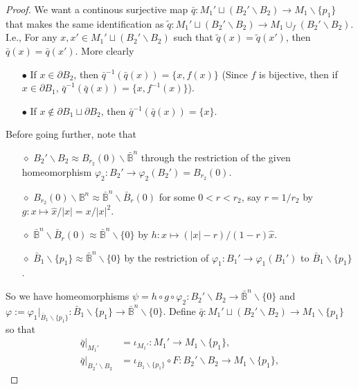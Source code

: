 \documentclass[a4paper]{article}
\theoremstyle{remark}
\newcommand{\openball}{\mathbb{B}} %
\newcommand{\closedball}{\bar{\mathbb{B}}} %
\newcommand{\doo}{\partial}    %
\begin{document}
\begin{proof}
	We want a continous surjective map $\bar{q} : M_1' \sqcup (B_2' \smallsetminus B_2) \to M_1 \smallsetminus \{p_1\}$ that makes the same identification as $\widetilde{q}: M_1' \sqcup (B_2'\smallsetminus B_2) \to M_1 \cup_f (B_2'\smallsetminus B_2)$. I.e., For any $x,x' \in M_1' \sqcup (B_2'\smallsetminus B_2)$ such that $\widetilde{q}(x) = \widetilde{q}(x')$, then $\bar{q}(x) = \bar{q}(x')$. More clearly
	\begin{enumerate}[nolistsep]
		\item [$\bullet$] If $x\in \doo B_2$, then $\bar{q}^{-1}(\bar{q}(x)) = \{x, f(x) \}$ (Since $f$ is bijective, then if $x \in \doo B_1$, $\bar{q}^{-1}(\bar{q}(x)) = \{x, f^{-1}(x)\}$). 
		\item [$\bullet$] If $x \notin \doo B_1 \sqcup \doo B_2$, then $\bar{q}^{-1}(\bar{q}(x)) = \{x\}$.
	\end{enumerate}
    Before going further, note that
    \begin{enumerate}
    	\item [$\diamond$] $B_2' \smallsetminus B_2 \approx B_{r_2}(0) \smallsetminus \bar{\mathbb{B}}^n$ through the restriction of the given homeomorphism $\varphi_2 : B_2' \to \varphi_2(B_2') = B_{r_2}(0)$.
    	\item [$\diamond$] $B_{r_2}(0) \smallsetminus \openball^n \approx \closedball^n \smallsetminus \bar{B}_{r}(0)$ for some $0<r<r_2$, say $r=1/r_2$ by $g : x \mapsto \hat{x}/|x| = x/|x|^2$.
    	\item [$\diamond$] $\closedball^n \smallsetminus \bar{B}_{r}(0) \approx \closedball^n \smallsetminus \{0\}$ by $h : x \mapsto (|x|-r)/(1-r) \hat{x}$.
    	\item [$\diamond$] $\bar{B}_1 \smallsetminus \{p_1\} \approx \closedball^n \smallsetminus \{0\}$ by the restriction of $\varphi_1 : B_1' \to \varphi_1(B_1')$ to $\bar{B}_1 \smallsetminus \{p_1\}$.
    \end{enumerate}
    So we have homeomorphisms $\psi = h \circ g \circ \varphi_2: B_2' \smallsetminus B_2 \to \closedball^n \smallsetminus \{0\}$ and $\varphi := \varphi_1|_{\bar{B}_1 \smallsetminus \{p_1\}} : \bar{B}_1 \smallsetminus \{p_1\} \to \closedball^n \smallsetminus \{0\}$. Define $\bar{q}: M_1' \sqcup (B_2' \smallsetminus B_2) \to M_1 \smallsetminus \{p_1\} $ so that 
    \begin{align*}
    \bar{q}|_{M_1'}&= \iota_{M_1'} : M_1' \to M_1 \smallsetminus \{p_1\},\\
    \bar{q}|_{B_2' \smallsetminus B_2} &= \iota_{\bar{B}_1 \smallsetminus \{p_1\}} \circ F : B_2' \smallsetminus B_2 \to M_1\smallsetminus \{p_1\},

\end{align*}
\end{proof}
\end{document}
